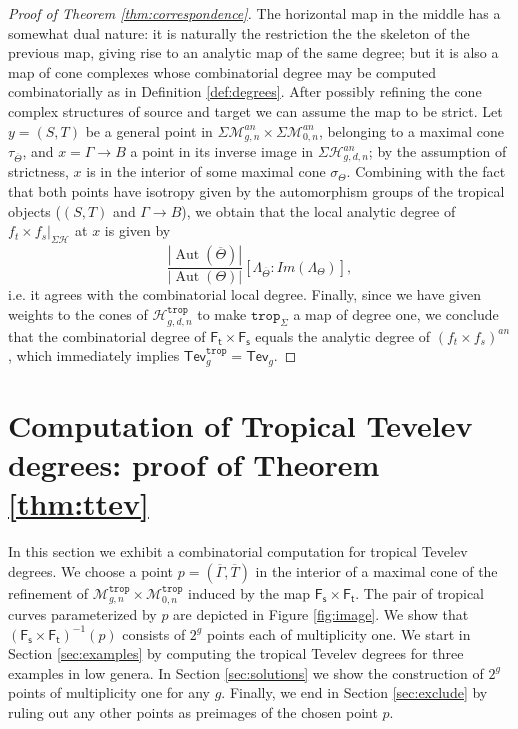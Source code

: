 \documentclass[11pt,reqno]{amsart}
\theoremstyle{definition}
\newcommand\trop{{\mathtt{trop}}}
\DeclareMathOperator{\Aut}{\mathrm Aut}
\newcommand\Mgn[1]{\mathcal M_{#1}}
\newcommand\Hur[1]{\mathcal H_{#1}}
\newcommand{\Ft}{\mathsf{F_t}}
\newcommand{\Fs}{\mathsf{F_s}}
\newcommand{\Tev}{{\mathsf{Tev}}}
\begin{document}
\begin{proof}[Proof of Theorem \ref{thm:correspondence}]
The horizontal map in the middle has a somewhat dual nature: it is naturally the restriction the the skeleton of the previous map, giving rise to an analytic map of the same degree; but it is also a map of cone complexes whose combinatorial degree may be computed combinatorially as in Definition \ref{def:degrees}. After possibly refining the cone complex structures of source and target we can assume the map to be strict. Let $y = (S,T)$ be a general point in $\Sigma\Mgn{g,n}^{an} \times \Sigma\Mgn{0,n}^{an}$, belonging to a maximal cone $\tau_{\overline\Theta}$, and $x = \Gamma \to B$ a point in its inverse image in $\Sigma\Hur{g,d,n}^{an}$; by the assumption of strictness, $x$ is in the interior  of some maximal cone $\sigma_\Theta$. Combining \cite[Section 6]{Rab} with the fact that both points have isotropy given by the automorphism groups of the tropical objects ($(S,T)$ and $\Gamma\to B$), we obtain that the local analytic degree of $f_t\times f_s\vert_{\Sigma\Hur{}}$ at $x$ is given by 
\[
\frac{|\Aut(\overline\Theta)|}{|\Aut(\Theta)|} [\Lambda_{\overline \Theta}: Im(\Lambda_\Theta)],
\]
i.e. it agrees with the combinatorial local degree. Finally, since we have given weights to the cones of $\Hur{g,d,n}^\trop$ to make $\trop_\Sigma$ a map of degree one, we conclude that the combinatorial degree of $\Ft\times\Fs$ equals the analytic degree of $(f_t\times f_s)^{an}$, which immediately implies $\Tev^\trop_g = \Tev_g$.


 
\end{proof}

\section{Computation of Tropical Tevelev degrees: proof of Theorem \ref{thm:ttev}}


In this section we exhibit a combinatorial computation for tropical Tevelev degrees.
We choose a point $p = (\overline{\Gamma}, \overline{T})$ in the interior of a maximal cone of the refinement of $\Mgn{g,n}^\trop\times \Mgn{0,n}^\trop$ induced by the map $\Fs\times \Ft$. The pair of tropical curves parameterized by $p$ are depicted in Figure \ref{fig:image}. We show that $(\Fs\times\Ft)^{-1}(p)$ consists of $2^g$ points each of multiplicity one. %
We start in Section \ref{sec:examples} by computing the tropical Tevelev degrees for three examples in low genera. In Section \ref{sec:solutions} we show the construction of $2^g$ points of multiplicity one for any $g$. Finally, we end in Section \ref{sec:exclude} by ruling out any other points as preimages of the chosen point $p$. 
\end{document}
